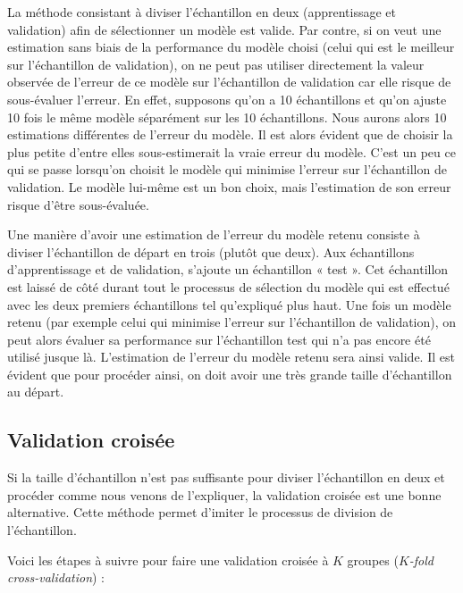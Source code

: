 \documentclass[
  11pt,
  letterpaper,
]{scrbook}
\theoremstyle{definition}
\theoremstyle{remark}
\begin{document}
La méthode consistant à diviser l'échantillon en deux (apprentissage et
validation) afin de sélectionner un modèle est valide. Par contre, si on
veut une estimation sans biais de la performance du modèle choisi (celui
qui est le meilleur sur l'échantillon de validation), on ne peut pas
utiliser directement la valeur observée de l'erreur de ce modèle sur
l'échantillon de validation car elle risque de sous-évaluer l'erreur. En
effet, supposons qu'on a 10 échantillons et qu'on ajuste 10 fois le même
modèle séparément sur les 10 échantillons. Nous aurons alors 10
estimations différentes de l'erreur du modèle. Il est alors évident que
de choisir la plus petite d'entre elles sous-estimerait la vraie erreur
du modèle. C'est un peu ce qui se passe lorsqu'on choisit le modèle qui
minimise l'erreur sur l'échantillon de validation. Le modèle lui-même
est un bon choix, mais l'estimation de son erreur risque d'être
sous-évaluée.

Une manière d'avoir une estimation de l'erreur du modèle retenu consiste
à diviser l'échantillon de départ en trois (plutôt que deux). Aux
échantillons d'apprentissage et de validation, s'ajoute un échantillon «
test ». Cet échantillon est laissé de côté durant tout le processus de
sélection du modèle qui est effectué avec les deux premiers échantillons
tel qu'expliqué plus haut. Une fois un modèle retenu (par exemple celui
qui minimise l'erreur sur l'échantillon de validation), on peut alors
évaluer sa performance sur l'échantillon test qui n'a pas encore été
utilisé jusque là. L'estimation de l'erreur du modèle retenu sera ainsi
valide. Il est évident que pour procéder ainsi, on doit avoir une très
grande taille d'échantillon au départ.

\subsection{Validation croisée}\label{validation-croisuxe9e}

Si la taille d'échantillon n'est pas suffisante pour diviser
l'échantillon en deux et procéder comme nous venons de l'expliquer, la
validation croisée est une bonne alternative. Cette méthode permet
d'imiter le processus de division de l'échantillon.

Voici les étapes à suivre pour faire une validation croisée à \(K\)
groupes (\emph{\(K\)-fold cross-validation}) :
\end{document}
